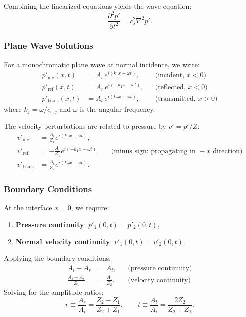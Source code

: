 \begin{proposition}
Combining the linearized equations yields the wave equation:
\begin{equation}
\label{eq:wave_equation}
\frac{\partial^2 p'}{\partial t^2} = c_s^2 \nabla^2 p'.
\end{equation}
\end{proposition}

\subsubsection{Plane Wave Solutions}

For a monochromatic plane wave at normal incidence, we write:
\begin{align}
\label{eq:plane_waves}
p'_{\text{inc}}(x,t) &= A_i \, e^{i(k_1 x - \omega t)}, && \text{(incident, } x < 0\text{)} \\
p'_{\text{ref}}(x,t) &= A_r \, e^{i(-k_1 x - \omega t)}, && \text{(reflected, } x < 0\text{)} \\
p'_{\text{trans}}(x,t) &= A_t \, e^{i(k_2 x - \omega t)}, && \text{(transmitted, } x > 0\text{)}
\end{align}
where $k_j = \omega / c_{s,j}$ and $\omega$ is the angular frequency.

The velocity perturbations are related to pressure by $v' = p' / Z$:
\begin{align}
\label{eq:velocity_waves}
v'_{\text{inc}} &= \frac{A_i}{Z_1} e^{i(k_1 x - \omega t)}, \\
v'_{\text{ref}} &= -\frac{A_r}{Z_1} e^{i(-k_1 x - \omega t)}, && \text{(minus sign: propagating in } -x\text{ direction)} \\
v'_{\text{trans}} &= \frac{A_t}{Z_2} e^{i(k_2 x - \omega t)}.
\end{align}

\subsubsection{Boundary Conditions}

At the interface $x = 0$, we require:
\begin{enumerate}
    \item \textbf{Pressure continuity}: $p'_1(0,t) = p'_2(0,t)$,
    \item \textbf{Normal velocity continuity}: $v'_1(0,t) = v'_2(0,t)$.
\end{enumerate}

\begin{proposition}
\label{prop:amplitude_coefficients}
Applying the boundary conditions:
\begin{align}
A_i + A_r &= A_t, && \text{(pressure continuity)} \\
\frac{A_i - A_r}{Z_1} &= \frac{A_t}{Z_2}. && \text{(velocity continuity)}
\end{align}
Solving for the amplitude ratios:
\begin{equation}
\label{eq:amplitude_r_t}
r \equiv \frac{A_r}{A_i} = \frac{Z_2 - Z_1}{Z_2 + Z_1}, \qquad t \equiv \frac{A_t}{A_i} = \frac{2 Z_2}{Z_2 + Z_1}.
\end{equation}
\end{proposition}

